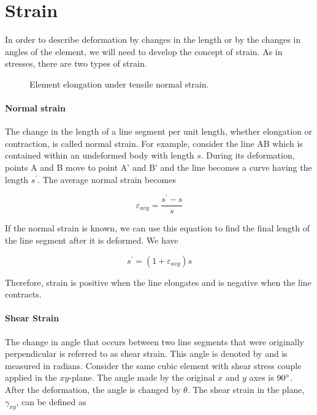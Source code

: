 \documentclass[
10pt,
a4paper,
openany,
svgnames,
]{book} %
\begin{document}
\section{Strain}

In order to describe deformation by changes in the length or by the changes in angles of the element, we will need to develop the concept of strain. As in stresses, there are two types of strain.

\begin{figure}[h]
  \centering
  \caption{Element elongation under tensile normal strain.}
\end{figure}

\paragraph{Normal strain} The change in the length of a line segment per unit length, whether elongation or contraction, is called normal strain. For example, consider the line AB which is contained within an undeformed body with length $s$. During its deformation, points A and B move to point A’ and B’ and the line becomes a curve having the length $s^\prime$. The average normal strain becomes

\begin{equation}
  \varepsilon_{avg} = \frac{s^\prime - s}{s}
\end{equation}

If the normal strain is known, we can use this equation to find the final length of the line segment after it is deformed. We have

\begin{equation}
  s^\prime = (1 + \varepsilon_{avg})s
\end{equation}

Therefore, strain is positive when the line elongates and is negative when the line contracts.

\paragraph{Shear Strain} The change in angle that occurs between two line segments that were originally perpendicular is referred to as shear strain. This angle is denoted by and is measured in radians. Consider the same cubic element with shear stress couple applied in the $xy$-plane. The angle made by the original $x$ and $y$ axes is $90\degree$. After the deformation, the angle is changed by $\theta$. The shear strain in the plane, $\gamma_{xy}$, can be defined as 
\end{document}
